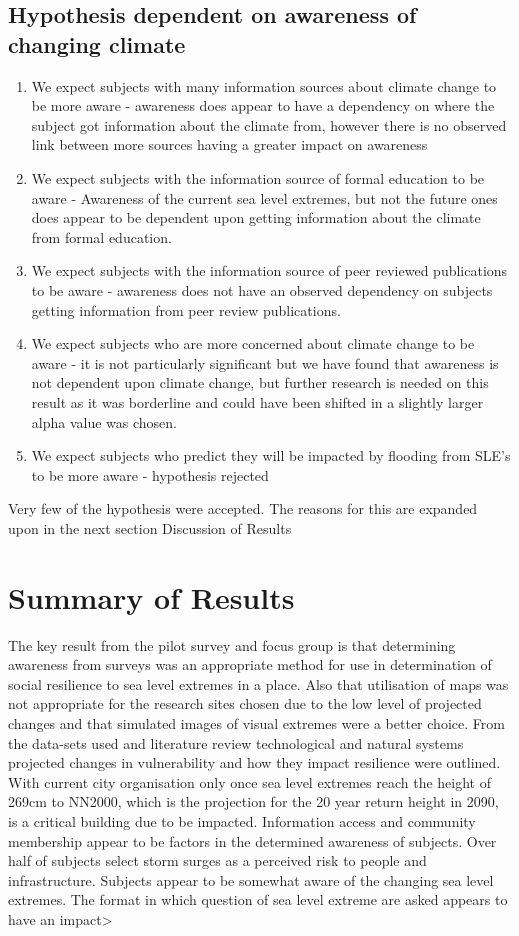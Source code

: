 \subsection{Hypothesis dependent on awareness of changing climate}
\begin{enumerate}
    \item We expect subjects with many information sources about climate change to be more aware - awareness does appear to have a dependency on where the subject got information about the climate from, however there is no observed link between more sources having a greater impact on awareness
    \item We expect subjects with the information source of formal education to be aware - Awareness of the current sea level extremes, but not the future ones does appear to be dependent upon getting information about the climate from formal education. 
    \item We expect subjects with the information source of peer reviewed publications to be aware - awareness does not have an observed dependency on subjects getting information from peer review publications.
    \item We expect subjects who are more concerned about climate change to be aware - it is not particularly significant but we have found that awareness is not dependent upon climate change, but further research is needed on this result as it was borderline and could have been shifted in a slightly larger alpha value was chosen.
    \item We expect subjects who predict they will be impacted by flooding from SLE's to be more aware - hypothesis rejected
\end{enumerate}

Very few of the hypothesis were accepted. The reasons for this are expanded upon in the next section Discussion of Results

\section{Summary of Results}
The key result from the pilot survey and focus group is that determining awareness from surveys was an appropriate method for use in determination of social resilience to sea level extremes in a place. Also that utilisation of maps was not appropriate for the research sites chosen due to the low level of projected changes and that simulated images of visual extremes were a better choice. From the data-sets used and literature review technological and natural systems projected changes in vulnerability and how they impact resilience were outlined. With current city organisation only once sea level extremes reach the height of 269cm to NN2000, which is the projection for the 20 year return height in 2090, is a critical building due to be impacted. Information access and community membership appear to be factors in the determined awareness of subjects. Over half of subjects select storm surges as a perceived risk to people and infrastructure. Subjects appear to be somewhat aware of the changing sea level extremes. The format in which question of sea level extreme are asked appears to have an impact> 

